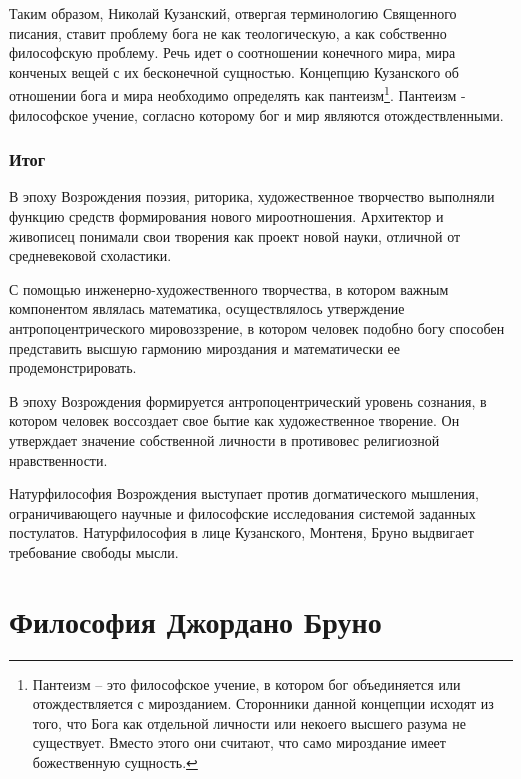 \documentclass[
]{article}
\begin{document}
Таким образом, Николай Кузанский, отвергая терминологию Священного
писания, ставит проблему бога не как теологическую, а как собственно
философскую проблему. Речь идет о соотношении конечного мира, мира
конченых вещей с их бесконечной сущностью. Концепцию Кузанского об
отношении бога и мира необходимо определять как пантеизм\footnote{Пантеизм
  -- это философское учение, в котором бог объединяется или
  отождествляется с мирозданием. Сторонники данной концепции исходят из
  того, что Бога как отдельной личности или некоего высшего разума не
  существует. Вместо этого они считают, что само мироздание имеет
  божественную сущность.}. Пантеизм - философское учение, согласно
которому бог и мир являются отождествленными.

\hypertarget{ux438ux442ux43eux433-7}{%
\subsubsection{Итог}\label{ux438ux442ux43eux433-7}}

В эпоху Возрождения поэзия, риторика, художественное творчество
выполняли функцию средств формирования нового мироотношения. Архитектор
и живописец понимали свои творения как проект новой науки, отличной от
средневековой схоластики.

С помощью инженерно-художественного творчества, в котором важным
компонентом являлась математика, осуществлялось утверждение
антропоцентрического мировоззрение, в котором человек подобно богу
способен представить высшую гармонию мироздания и математически ее
продемонстрировать.

В эпоху Возрождения формируется антропоцентрический уровень сознания, в
котором человек воссоздает свое бытие как художественное творение. Он
утверждает значение собственной личности в противовес религиозной
нравственности.

Натурфилософия Возрождения выступает против догматического мышления,
ограничивающего научные и философские исследования системой заданных
постулатов. Натурфилософия в лице Кузанского, Монтеня, Бруно выдвигает
требование свободы мысли.

\hypertarget{ux444ux438ux43bux43eux441ux43eux444ux438ux44f-ux434ux436ux43eux440ux434ux430ux43dux43e-ux431ux440ux443ux43dux43e}{%
\section{Философия Джордано
Бруно}\label{ux444ux438ux43bux43eux441ux43eux444ux438ux44f-ux434ux436ux43eux440ux434ux430ux43dux43e-ux431ux440ux443ux43dux43e}}
\end{document}
